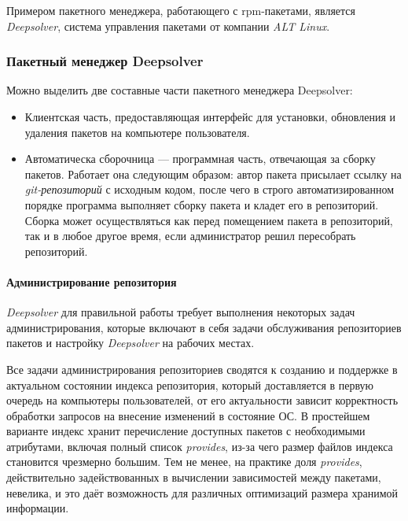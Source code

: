 Примером пакетного менеджера, работающего с rpm-пакетами, является \textit{Deepsolver}, система
управления пакетами от компании \textit{ALT Linux}.\\

\subsubsection{Пакетный менеджер Deepsolver}
Можно выделить две составные части пакетного менеджера Deepsolver:
\begin{itemize}
\item{Клиентская часть, предоставляющая интерфейс для установки, обновления
 и удаления пакетов на компьютере пользователя.}
\item{Автоматическа сборочница --- программная часть, отвечающая за сборку пакетов.
Работает она следующим образом: автор пакета присылает ссылку на \textit{git-репозиторий} с исходным кодом, %
после чего в строго автоматизированном порядке программа выполняет сборку пакета и кладет
его в репозиторий. Сборка может осуществляться как перед помещением пакета в репозиторий,
так и в любое другое время, если администратор решил пересобрать репозиторий.}
\end{itemize}

\paragraph{Администрирование репозитория\\} 
\textit{Deepsolver} для правильной работы требует выполнения некоторых задач 
администрирования, которые включают в себя задачи обслуживания репозиториев
пакетов и настройку \textit{Deepsolver} на рабочих местах.

Все задачи администрирования репозиториев сводятся к созданию и поддержке в
актуальном состоянии индекса репозитория, который доставляется в первую очередь на компьютеры
пользователей, от его актуальности зависит корректность обработки запросов 
на внесение изменений в состояние ОС. В простейшем варианте индекс
хранит перечисление доступных пакетов с необходимыми атрибутами, включая
полный список \textit{provides}, из-за чего размер файлов индекса становится
чрезмерно большим. Тем не менее, на практике доля \textit{provides}, действительно
задействованных в вычислении зависимостей между пакетами, невелика,
и это даёт возможность для различных оптимизаций размера хранимой информации.

